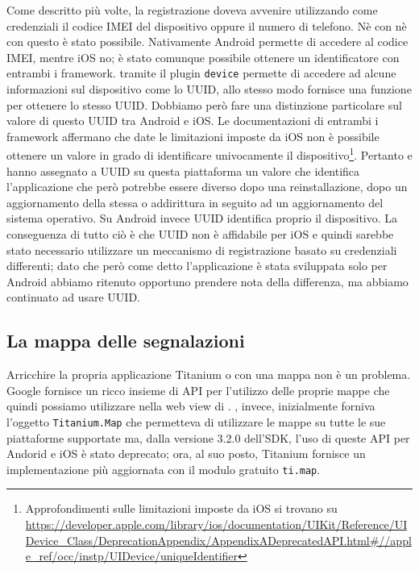             Come descritto più volte, la registrazione doveva avvenire utilizzando
            come credenziali il codice IMEI del dispositivo oppure il numero di telefono.
            Nè con \pg{} nè con \tisdk{} questo è stato possibile. Nativamente
            Android permette di accedere al codice IMEI, mentre iOS no; è stato
            comunque possibile ottenere un identificatore con entrambi i
            framework. \pg{} tramite il plugin \texttt{device} permette di accedere
            ad alcune informazioni sul dispositivo come lo UUID, allo stesso
            modo \tisdk{} fornisce una funzione per ottenere lo stesso UUID.
            Dobbiamo però fare una distinzione particolare sul valore di questo
            UUID tra Android e iOS.
            Le documentazioni di entrambi i framework affermano che date le limitazioni
            imposte da iOS non è possibile ottenere un valore in grado di identificare
            univocamente il dispositivo\footnote{Approfondimenti sulle limitazioni
            imposte da iOS si trovano su \url{https://developer.apple.com/library/ios/documentation/UIKit/Reference/UIDevice_Class/DeprecationAppendix/AppendixADeprecatedAPI.html\#//apple_ref/occ/instp/UIDevice/uniqueIdentifier}}.
            Pertanto \pg{} e \tisdk{} hanno assegnato a UUID su questa piattaforma
            un valore che identifica l'applicazione che però potrebbe essere diverso
            dopo una reinstallazione, dopo
            un aggiornamento della stessa o addirittura in seguito ad un
            aggiornamento del sistema operativo.
            Su Android invece UUID
            identifica proprio il dispositivo. La conseguenza di tutto ciò è che
            UUID non è affidabile per iOS e quindi sarebbe stato necessario utilizzare
            un meccanismo di registrazione basato su credenziali differenti;
            dato che però come detto l'applicazione è stata sviluppata solo per Android
            abbiamo ritenuto opportuno prendere nota della differenza, ma abbiamo
            continuato ad usare UUID.


        \subsection{La mappa delle segnalazioni}
            Arricchire la propria applicazione Titanium o \pg{} con una mappa
            non è un problema. Google fornisce un ricco insieme di API \js{} per
            l'utilizzo delle proprie mappe che quindi possiamo utilizzare nella
            web view di \pg{}. \tisdk, invece, inizialmente forniva l'oggetto
            \texttt{Titanium.Map} che permetteva di utilizzare le mappe su tutte
            le sue piattaforme supportate ma, dalla versione 3.2.0 dell'SDK, l'uso
            di queste API per Andorid e iOS è stato deprecato; ora, al suo posto,
            Titanium fornisce un implementazione più aggiornata con il modulo
            gratuito \texttt{ti.map}.

